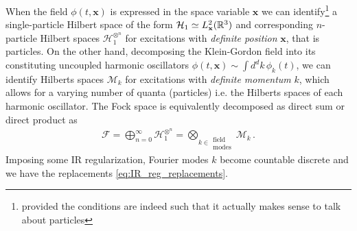\documentclass[../QFT_main.tex]{subfiles}
\begin{document}
\begin{mytheorem}
%
When the field $\phi(t,\mathbf{x})$ is expressed in the space variable $\mathbf{x}$ we can identify\footnote{provided the conditions are indeed such that it actually makes sense to talk about particles} a single-particle Hilbert space of the form $\mathcal{H}_1\simeq L^2_{\mathbf{x}}(\mathbb{R}^3)$ and corresponding $n$-particle Hilbert spaces $\mathcal{H}_1^{\otimes^n}$ for excitations with \emph{definite position} $\mathbf{x}$, that is particles.
%
On the other hand, decomposing the Klein-Gordon field into its constituting uncoupled harmonic oscillators $\phi(t,\mathbf{x})\sim \int d^dk\, \phi_k(t)$, we can identify Hilberts spaces $\mathcal{M}_k$ for excitations with \emph{definite momentum} $k$, which allows for a varying number of quanta (particles) i.e. the Hilberts spaces of each harmonic oscillator.
%
The Fock space is equivalently decomposed as direct sum or direct product as
\begin{align}
    \mathcal{F}=\bigoplus_{n=0}^\infty \mathcal{H}_1^{\otimes^n}=\bigotimes_{k\in\substack{\text{field}\\\mathrm{modes}}} \mathcal{M}_k \,.
\end{align}
%
Imposing some IR regularization, Fourier modes $k$ become countable discrete and we have the replacements \eqref{eq:IR_reg_replacements}.


\end{mytheorem}
\end{document}
